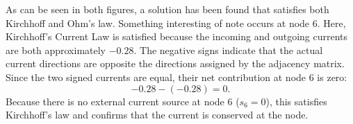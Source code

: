 \documentclass[12pt]{article}
\begin{document}
As can be seen in both figures, a solution has been found that satisfies both Kirchhoff and Ohm's law. Something interesting of note occurs at node 6. Here, Kirchhoff's Current Law is satisfied because the incoming and outgoing currents are both approximately \(-0.28\). The negative signs indicate that the actual current directions are opposite the directions assigned by the adjacency matrix. Since the two signed currents are equal, their net contribution at node 6 is zero:
$$
-0.28-(-0.28)=0.
$$
Because there is no external current source at node 6 (\(s_6=0\)), this satisfies Kirchhoff's law and confirms that the current is conserved at the node.
\end{document}
